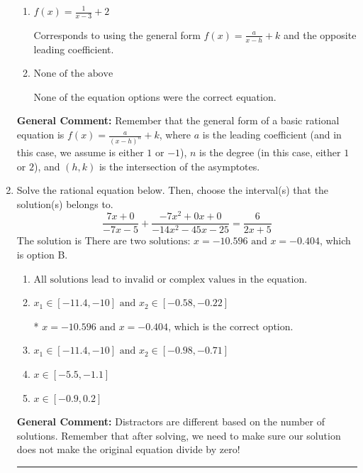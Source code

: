 \documentclass{extbook}[14pt]
\newcommand{\litem}[1]{\item #1

\rule{\textwidth}{0.4pt}}
\begin{document}
\begin{enumerate}
{\begin{enumerate}[label=\Alph*.]
The $x$-value of the equation does not match the graph.
\item \( f(x) = \frac{1}{x - 3} + 2 \)

Corresponds to using the general form $f(x) = \frac{a}{x-h}+k$ and the opposite leading coefficient.
\item \( \text{None of the above} \)

None of the equation options were the correct equation.
\end{enumerate}

\textbf{General Comment:} Remember that the general form of a basic rational equation is $ f(x) = \frac{a}{(x-h)^n} + k$, where $a$ is the leading coefficient (and in this case, we assume is either $1$ or $-1$), $n$ is the degree (in this case, either $1$ or $2$), and $(h, k)$ is the intersection of the asymptotes.
}
\litem{
Solve the rational equation below. Then, choose the interval(s) that the solution(s) belongs to.
\[ \frac{7x + 0}{-7x -5} + \frac{-7x^{2} +0 x + 0}{-14x^{2} -45 x -25} = \frac{6}{2x + 5} \]The solution is \( \text{There are two solutions: } x = -10.596 \text{ and } x = -0.404 \), which is option B.\begin{enumerate}[label=\Alph*.]
\item \( \text{All solutions lead to invalid or complex values in the equation.} \)


\item \( x_1 \in [-11.4, -10] \text{ and } x_2 \in [-0.58,-0.22] \)

* $x = -10.596 \text{ and } x = -0.404$, which is the correct option.
\item \( x_1 \in [-11.4, -10] \text{ and } x_2 \in [-0.98,-0.71] \)


\item \( x \in [-5.5,-1.1] \)


\item \( x \in [-0.9,0.2] \)


\end{enumerate}

\textbf{General Comment:} Distractors are different based on the number of solutions. Remember that after solving, we need to make sure our solution does not make the original equation divide by zero!
}
\end{enumerate}
\end{document}
